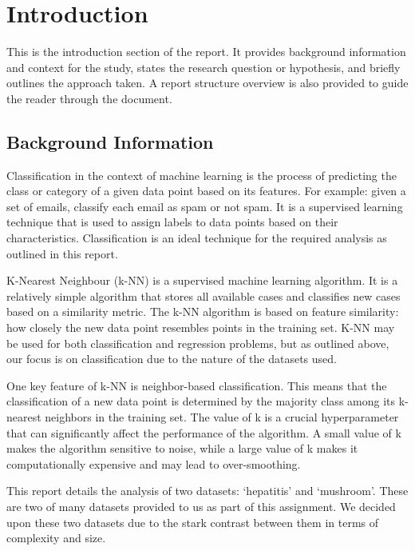 \section{Introduction}
\label{sec:introduction}

This is the introduction section of the report. It provides background information and context for the study, states the research question or hypothesis, and briefly outlines the approach taken.
A report structure overview is also provided to guide the reader through the document.

\subsection{Background Information}

Classification in the context of machine learning is the process of predicting the class or category of a given data point based on its features.
For example: given a set of emails, classify each email as spam or not spam. 
It is a supervised learning technique that is used to assign labels to data points based on their characteristics.
Classification is an ideal technique for the required analysis as outlined in this report.\par

K-Nearest Neighbour (k-NN) is a supervised machine learning algorithm.
It is a relatively simple algorithm that stores all available cases and classifies new cases based on a similarity metric.
The k-NN algorithm is based on feature similarity: how closely the new data point resembles points in the training set.
K-NN may be used for both classification and regression problems, but as outlined above, our focus is on classification due to the nature of the datasets used.\par

One key feature of k-NN is neighbor-based classification. 
This means that the classification of a new data point is determined by the majority class among its k-nearest neighbors in the training set. 
The value of k is a crucial hyperparameter that can significantly affect the performance of the algorithm.
A small value of k makes the algorithm sensitive to noise, while a large value of k makes it computationally expensive and may lead to over-smoothing.

This report details the analysis of two datasets: `hepatitis' and `mushroom'. These are two of many datasets provided to us as part of this assignment.
We decided upon these two datasets due to the stark contrast between them in terms of complexity and size.

